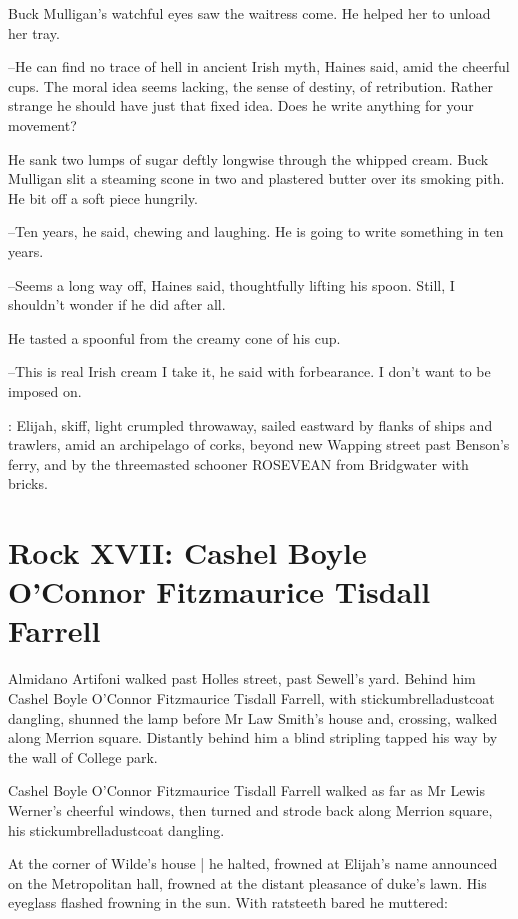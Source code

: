 Buck Mulligan's watchful eyes saw the waitress come.
He helped her to unload her tray.

--He can find no trace of hell in ancient Irish myth,
Haines said,
amid
the cheerful cups.
The moral idea seems lacking,
the sense of destiny, of
retribution.
Rather strange he should have just that fixed idea.
Does he
write anything for your movement?

He sank two lumps of sugar deftly longwise
through the whipped
cream.
Buck Mulligan slit a steaming scone in two
and plastered butter
over its smoking pith.
He bit off a soft piece hungrily.

--Ten years,
he said,
chewing and laughing.
He is going to write something in ten years.%

--Seems a long way off,
Haines said,
thoughtfully lifting his spoon.
Still, I shouldn't wonder if he did after all.

He tasted a spoonful from the creamy cone of his cup.

--This is real Irish cream I take it,
he said with forbearance.
I don't want to be imposed on.

:
Elijah,
skiff,
light crumpled throwaway,
sailed eastward by flanks of
ships and trawlers,
amid an archipelago of corks,
beyond new Wapping
street
past Benson's ferry,
and by the threemasted schooner ROSEVEAN from
Bridgwater with bricks.


\section*{Rock XVII: Cashel Boyle O'Connor Fitzmaurice Tisdall Farrell}


Almidano Artifoni walked past Holles street,
past Sewell's yard.
Behind him
Cashel Boyle O'Connor Fitzmaurice Tisdall Farrell,
with
stickumbrelladustcoat dangling,
shunned the lamp before Mr Law Smith's
house
and, crossing, walked along Merrion square.
Distantly behind him a
blind stripling
tapped his way by the wall of College park.

Cashel Boyle O'Connor Fitzmaurice Tisdall Farrell
walked as far as
Mr Lewis Werner's cheerful windows,
then turned and strode back along
Merrion square,
his stickumbrelladustcoat dangling.

At the corner of Wilde's house |
he halted,
frowned at Elijah's name announced on the Metropolitan hall,
frowned at the distant pleasance of duke's lawn.
His eyeglass flashed frowning in the sun.
With ratsteeth bared he muttered:

